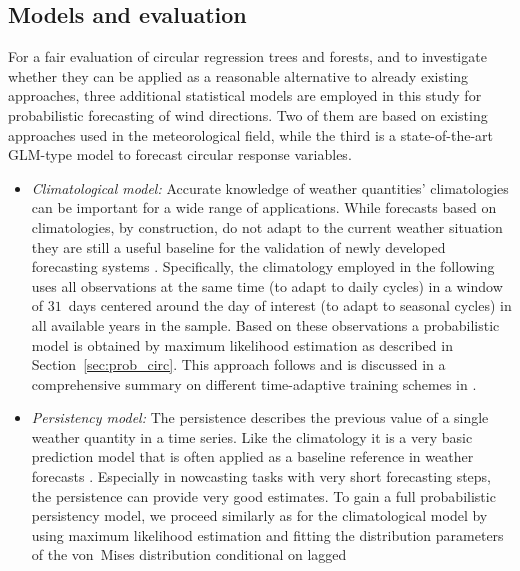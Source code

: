 \documentclass{statsoc}
\begin{document}
\subsection{Models and evaluation}
\label{sec:wind:models}
For a fair evaluation of circular regression trees and forests, and to
investigate whether they can be applied as a reasonable alternative to already
existing approaches, three additional statistical models are employed in this
study for probabilistic forecasting of wind directions. Two of them are based
on existing approaches used in the meteorological field, while the third is a
state-of-the-art GLM-type model to forecast circular response variables.

\begin{itemize}
  \item \emph{Climatological model:} 
    Accurate knowledge of weather quantities' climatologies can be important for a
    wide range of applications. While forecasts based on climatologies, by
    construction, do not adapt to the current weather situation they are still a
    useful baseline for the validation of newly developed forecasting systems
    \citep{Simon+Umlauf+Zeileis:2017, Stauffer+Mayr+Messner:2017}. 
    \newline
    Specifically, the climatology employed in the following uses all observations
    at the same time (to adapt to daily cycles) in a window of $31$~days centered
    around the day of interest (to adapt to seasonal cycles)
    in all available years in the sample. Based on these observations a probabilistic
    model is obtained by maximum likelihood estimation as described in
    Section~\ref{sec:prob_circ}. This approach follows \citet{Vogel+Knippertz+Fink:2018}
    and is discussed in a comprehensive summary on different time-adaptive training schemes in
    \citet{Lang+Lerch+Mayr:2019}.
  \item \emph{Persistency model:}
    The persistence describes the previous value of a single weather quantity
    in a time series. Like the climatology it is a very basic prediction model that
    is often applied as a baseline reference in weather forecasts
    \citep{noaasnationalweatherservice:2019}. Especially in nowcasting tasks with very short
    forecasting steps, the persistence can provide very good estimates.
    \newline
    To gain a full probabilistic persistency model, we proceed similarly as for
    the climatological model by using maximum likelihood estimation and fitting the
    distribution parameters of the von~Mises distribution conditional on lagged

\end{itemize}
\end{document}
